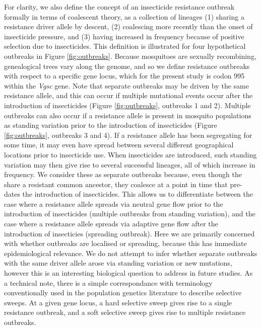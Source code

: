 \documentclass[a4paper,11pt,abstracton]{scrartcl}
\begin{document}
%
For clarity, we also define the concept of an insecticide resistance outbreak formally in terms of coalescent theory, as a collection of lineages (1) sharing a resistance driver allele by descent, (2) coalescing more recently than the onset of insecticide pressure, and (3) having increased in frequency because of positive selection due to insecticides. 
%
This definition is illustrated for four hypothetical outbreaks in Figure \ref{fig:outbreaks}.
%
Because mosquitoes are sexually recombining, genealogical trees vary along the genome, and so we define resistance outbreaks with respect to a specific gene locus, which for the present study is codon 995 within the \textit{Vgsc} gene.
%
Note that separate outbreaks may be driven by the same resistance allele, and this can occur if multiple mutational events occur after the introduction of insecticides (Figure \ref{fig:outbreaks}, outbreaks 1 and 2).
%
Multiple outbreaks can also occur if a resistance allele is present in mosquito populations as standing variation prior to the introduction of insecticides (Figure \ref{fig:outbreaks}, outbreaks 3 and 4).
% 
If a resistance allele has been segregating for some time, it may even have spread between several different geographical locations prior to insecticide use.
%
When insecticides are introduced, such standing variation may then give rise to several successful lineages, all of which increase in frequency.
%
We consider these as separate outbreaks because, even though the share a resistant common ancestor, they coalesce at a point in time that pre-dates the introduction of insecticides.
%
This allows us to differentiate between the case where a resistance allele spreads via neutral gene flow prior to the introduction of insecticides (multiple outbreaks from standing variation), and the case where a resistance allele spreads via adaptive gene flow after the introduction of insecticies (spreading outbreak).
%
Here we are primarily concerned with whether outbreaks are localised or spreading, because this has immediate epidemiological relevance.
%
We do not attempt to infer whether separate outbreaks with the same driver allele arose via standing variation or new mutations, however this is an interesting biological question to address in future studies.
%
As a technical note, there is a simple correspondance with terminology conventionally used in the population genetics literature to describe selective sweeps.
%
At a given gene locus, a hard selective sweep gives rise to a single resistance outbreak, and a soft selective sweep gives rise to multiple resistance outbreaks.
\end{document}
